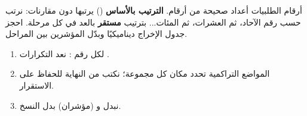 \begin{statement}
أرقام الطلبيات أعداد صحيحة من  أرقام. \textbf{الترتيب بالأساس} () يرتبها دون مقارنات: نرتب حسب رقم الآحاد، ثم العشرات، ثم المئات... بترتيب \textbf{مستقر} بالعد في كل مرحلة. احجز جدول الإخراج ديناميكيًا وبدّل المؤشرين بين المراحل.
\end{statement}
\begin{stepsbox}\begin{enumerate}
\item لكل رقم : نعد التكرارات .
\item المواضع التراكمية تحدد مكان كل مجموعة؛ نكتب من النهاية للحفاظ على الاستقرار.
\item نبدل  و  (مؤشران) بدل النسخ.
\end{enumerate}\end{stepsbox}
